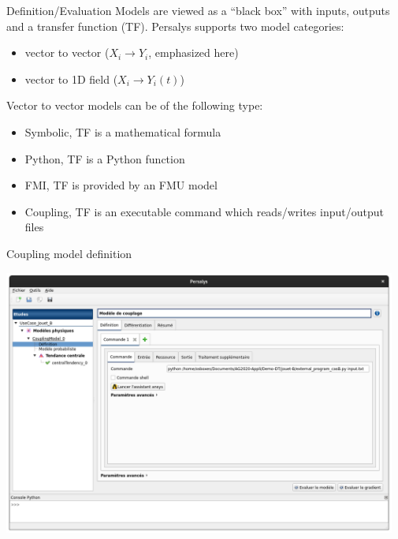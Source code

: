 \documentclass{beamer}
\begin{document}
    \begin{frame}{Definition/Evaluation}
    \protect\hypertarget{definitionevaluation}{}
    Models are viewed as a ``black box'' with inputs, outputs and a
    transfer function (TF).
    Persalys supports two model categories:
    
    \begin{itemize}
    \item
      vector to vector (\(X_i \rightarrow Y_i\), emphasized here)
    \item
      vector to 1D field (\(X_i \rightarrow Y_i(t)\))
    \end{itemize}
    
    \medskip

    Vector to vector models can be of the following type:
    
    \begin{itemize}
    
    \item
      Symbolic, TF is a mathematical formula
    \item
      Python, TF is a Python function
    \item
      FMI, TF is provided by an FMU model
    \item
      Coupling, TF is an executable command which reads/writes input/output
      files
    \end{itemize}
    \end{frame}
    
    \begin{frame}{Coupling model definition}
    
    \centering
    
    \includegraphics[width=0.97\textwidth]{figure/model_definition.png}
    
    \end{frame}
    
\end{document}

